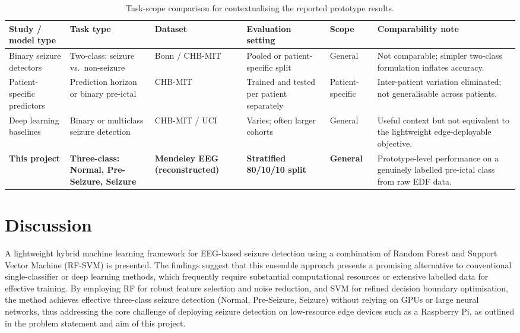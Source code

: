 \documentclass[12pt, a4paper]{report}
\begin{document}
\begin{table}[H]
  \centering
  \caption{Task-scope comparison for contextualising the reported prototype results.}
  \label{tab:literature_scope}
  \footnotesize
  \setlength{\tabcolsep}{4pt}
  \renewcommand{\arraystretch}{1.15}
  \begin{tabularx}{\textwidth}{>{\raggedright\arraybackslash}p{2.6cm}
                              >{\raggedright\arraybackslash}p{2.4cm}
                              >{\raggedright\arraybackslash}p{2.0cm}
                              >{\raggedright\arraybackslash}p{2.2cm}
                              >{\raggedright\arraybackslash}p{1.6cm}
                              >{\raggedright\arraybackslash}X}
    \toprule
    \textbf{Study / model type} &
    \textbf{Task type} &
    \textbf{Dataset} &
    \textbf{Evaluation setting} &
    \textbf{Scope} &
    \textbf{Comparability note} \\
    \midrule
    Binary seizure detectors &
    Two-class: seizure vs.\ non-seizure &
    Bonn / CHB-MIT &
    Pooled or patient-specific split &
    General &
    Not comparable; simpler two-class formulation inflates accuracy. \\
    Patient-specific predictors &
    Prediction horizon or binary pre-ictal &
    CHB-MIT &
    Trained and tested per patient separately &
    Patient-specific &
    Inter-patient variation eliminated; not generalisable across patients. \\
    Deep learning baselines &
    Binary or multiclass seizure detection &
    CHB-MIT / UCI &
    Varies; often larger cohorts &
    General &
    Useful context but not equivalent to the lightweight edge-deployable objective. \\
    \textbf{This project} &
    \textbf{Three-class: Normal, Pre-Seizure, Seizure} &
    \textbf{Mendeley EEG (reconstructed)} &
    \textbf{Stratified 80/10/10 split} &
    \textbf{General} &
    Prototype-level performance on a genuinely labelled pre-ictal class from raw EDF data. \\
    \bottomrule
  \end{tabularx}
\end{table}

\section{Discussion}

A lightweight hybrid machine learning framework for EEG-based seizure
detection using a combination of Random Forest and Support Vector Machine
(RF-SVM) is presented. The findings suggest that this ensemble approach
presents a promising alternative to conventional single-classifier or deep
learning methods, which frequently require substantial computational
resources or extensive labelled data for effective training. By employing
RF for robust feature selection and noise reduction, and SVM for refined
decision boundary optimisation, the method achieves effective three-class
seizure detection (Normal, Pre-Seizure, Seizure) without relying on GPUs
or large neural networks, thus addressing the core challenge of deploying
seizure detection on low-resource edge devices such as a Raspberry Pi, as
outlined in the problem statement and aim of this project.
\end{document}
